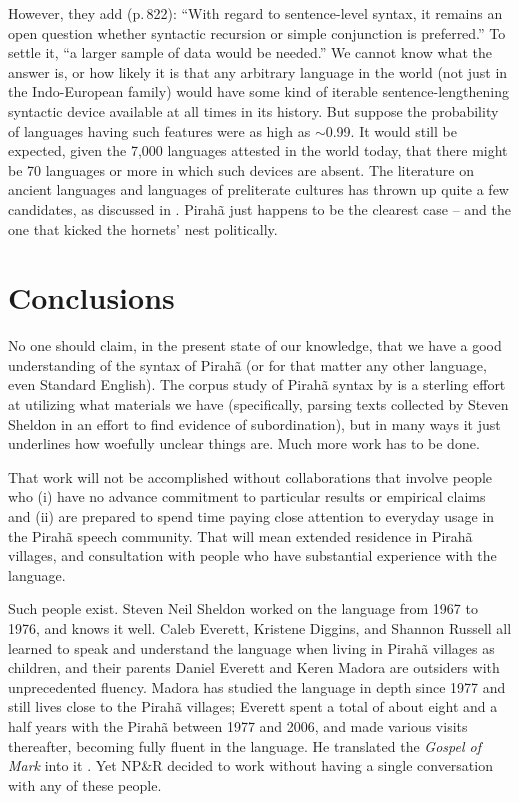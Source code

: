 \documentclass[output=paper,colorlinks,citecolor=brown
]{langscibook}
\begin{document}
However, they add (p.\,822): ``With regard to sentence-level syntax,
it remains an open question whether syntactic recursion or simple
conjunction is preferred.'' To settle it, ``a larger sample of data
would be needed.'' We cannot know what the answer is, or how likely
it is that any arbitrary language in the world (not just in the
Indo-European family) would have some kind of iterable
sentence-lengthening syntactic device available at all times in its
history. But suppose the probability of languages having such features
were as high as $\sim$0.99. It would still be expected, given the
7,000 languages attested in the world today, that there might be 70
languages or more in which such devices are absent. The literature
on ancient languages and languages of preliterate cultures has thrown
up quite a few candidates, as discussed in .
Pirahã just happens to be the clearest case -- and the one that
kicked the hornets' nest politically.

\section{Conclusions}

No one should claim, in the present state of our knowledge, that we
have a good understanding of the syntax of Pirahã (or for that
matter any other language, even Standard English). The corpus study
of Pirahã syntax by \citet{FutrellEtAl16} is a sterling effort
at utilizing what materials we have (specifically, parsing texts
collected by Steven Sheldon in an effort to find evidence of
subordination), but in many ways it just underlines how woefully
unclear things are. Much more work has to be done.

That work will not be accomplished without collaborations that involve
people who (i) have no advance commitment to particular results or
empirical claims and (ii) are prepared to spend time paying close
attention to everyday usage in the Pirahã speech community. That
will mean extended residence in Pirahã villages, and consultation
with people who have substantial experience with the language.

Such people exist. Steven Neil Sheldon worked on the language from
1967 to 1976, and knows it well. Caleb Everett, Kristene Diggins,
and Shannon Russell all learned to speak and understand the language
when living in Pirahã villages as children, and their parents
Daniel Everett and Keren Madora are outsiders with unprecedented
fluency. Madora has studied the language in depth since 1977 and
still lives close to the Pirahã villages; Everett spent a total
of about eight and a half years with the Pirahã between 1977
and 2006, and made various visits thereafter, becoming fully fluent
in the language. He translated the \textit{Gospel of Mark} into it
\citep{Everett86Mark}. Yet NP\&R decided to work without having a
single conversation with any of these people.
\end{document}
